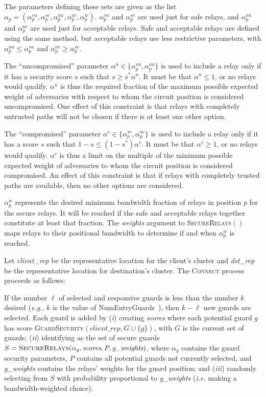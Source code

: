 \documentclass[conference]{styles/IEEEtran}
\newcommand{\eg}{\emph{e.g.}}
\newcommand{\ie}{\emph{i.e.}}
\begin{document}
The parameters defining these sets are given as the list
$\alpha_p = (\alpha^{su}_p, \alpha^{sc}_p, \alpha^{au}_p, \alpha^{ac}_p, \alpha^w_p)$.
$\alpha^{su}_p$ and $\alpha^{sc}_p$ are used just for safe relays, and $\alpha^{au}_p$ and
$\alpha^{ac}_p$ are used just for acceptable relays. Safe and acceptable relays are defined using
the same method, but acceptable relays use less restrictive parameters, with
$\alpha^{au}_p \le \alpha^{su}_p$ and $\alpha^{ac}_p \ge \alpha^{sc}_p$.

The ``uncompromised'' parameter
$\alpha^u\in \{\alpha^{su}_p, \alpha^{au}_p\}$ is used to include a relay only if it has a
security score $s$ such that $s\ge s^* \alpha^u$. It must be that $\alpha^u\le 1$, or no
relays would qualify. $\alpha^u$ is thus the required fraction of the maximum possible expected
weight of adversaries with
respect to whom the circuit position is considered uncompromised. One effect of this constraint is
that relays with completely untrusted paths will not be chosen if there is at least one other
option.

The ``compromised'' parameter $\alpha^c\in \{\alpha^{sc}_p, \alpha^{ac}_p\}$ is used to
include a relay only if it has a score $s$ such that $1-s \le (1-s^*) \alpha^c$.
It must be that $\alpha^c\ge 1$, or no relays would qualify.
$\alpha^c$ is thus a limit on the multiple of the minimum possible expected weight of adversaries to
whom the circuit position is considered compromised. An effect of this constraint is that if
relays with completely trusted paths are available, then no other options are considered.

$\alpha^w_p$ represents the desired minimum bandwidth fraction of relays in position $p$ for
the secure relays. It will be reached if the safe and acceptable relays together constitute at least
that fraction. The \textit{weights} argument to \textsc{SecureRelays}$()$ maps relays to their
positional bandwidth to determine if and when $\alpha^w_p$ is reached.

Let \textit{client\_rep} be the representative location for the client's cluster and
\textit{dst\_rep} be the representative location for destination's cluster. The \textsc{Connect}
process proceeds as follows:

If the number $\ell$ of selected and responsive guards is less than the number $k$ desired
(\eg{}, $k$ is the value of \textsf{NumEntryGuards}~\cite{dir-spec}), then $k-\ell$ new guards are
selected. Each guard is added by (\emph{i}) creating \textit{scores} where each potential guard $g$
has score
\textsc{GuardSecurity}$(\textit{client\_rep}, G\cup\{g\})$, with $G$ is the current set of guards;
(\emph{ii}) identifying as the set of secure guards
$S = \textsc{SecureRelays}(\alpha_g, \textit{scores}, P, \textit{g\_weights})$, where $\alpha_g$
contains the guard security parameters, $P$ contains all potential guards not currently selected,
and \textit{g\_weights} contains the relays' weights for the guard position; and (\emph{iii})
randomly selecting from $S$ with probability proportional to \textit{g\_weights} (\ie{} making a
bandwidth-weighted choice).
\end{document}
